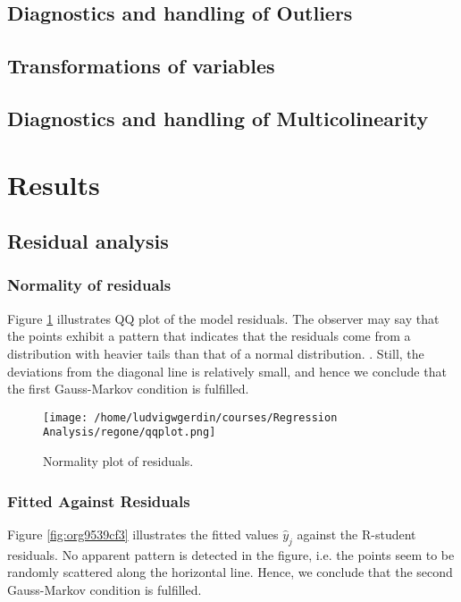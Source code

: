 \documentclass[11pt]{article}
\begin{document}
\subsection{Diagnostics and handling of Outliers}
\label{sec:org383509a}
\subsection{Transformations of variables}
\label{sec:org007d576}
\subsection{Diagnostics and handling of Multicolinearity}
\label{sec:orgc786672}
\section{Results}
\label{sec:org95403dc}
\subsection{Residual analysis}
\label{sec:org3bb7990}
\subsubsection{Normality of residuals}
\label{sec:org2469610}

Figure \ref{fig:org91b5aaa} illustrates QQ plot of the model residuals. The observer may say that the 
points exhibit a pattern that indicates 
that the residuals come from a distribution with heavier tails than that of a normal distribution. 
\cite{Montgomery2012}. Still, the deviations from the diagonal line is relatively small, and hence
we conclude that the first Gauss-Markov condition is fulfilled.

\begin{figure}[htbp]
\centering
\texttt{[image: /home/ludvigwgerdin/courses/Regression Analysis/regone/qqplot.png]}
\caption{\label{fig:org91b5aaa}
Normality plot of residuals.}
\end{figure}

\subsubsection{Fitted Against Residuals}
\label{sec:org0334fd6}

Figure \ref{fig:org9539cf3} illustrates the fitted values \(\hat y_j\) against the R-student residuals. No apparent 
pattern is detected in the figure, i.e. the points seem to be randomly scattered along the horizontal line.
Hence, we conclude that the second Gauss-Markov condition is fulfilled.
\end{document}
